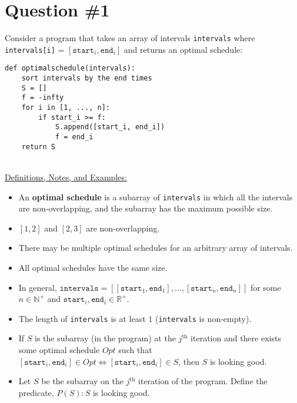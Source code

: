 \documentclass[12pt]{article}
\begin{document}
\renewcommand{\familydefault}{\rmdefault}



\pagebreak
\normalsize

\section*{Question \#1}
Consider a program that takes an array of intervals \texttt{intervals} where \texttt{intervals[i]} = \( [\texttt{start}_i, \texttt{end}_i] \) and returns an optimal schedule: \\
\begin{lstlisting}
def optimalschedule(intervals):
    sort intervals by the end times
    S = []
    f = -infty
    for i in [1, ..., n]:
        if start_i >= f:
            S.append([start_i, end_i])
            f = end_i
    return S
\end{lstlisting}
\leavevmode\\
\underline{Definitions, Notes, and Examples:}
\begin{itemize}
    \item An \textbf{optimal schedule} is a subarray of \texttt{intervals} in which all the intervals are non-overlapping, and the subarray has the maximum possible size.
    \item \( [1, 2] \) and \( [2, 3] \) are non-overlapping.
    \item There may be multiple optimal schedules for an arbitrary array of intervals.
    \item All optimal schedules have the same size.
    \item In general, \( \texttt{intervals} = [[\texttt{start}_1, \texttt{end}_1], \dots, [\texttt{start}_n, \texttt{end}_n]] \) for some \( n \in \mathbb{N}^+ \) and \( \texttt{start}_i, \texttt{end}_i \in \mathbb{R}^+ \).
    \item The length of \texttt{intervals} is at least $1$ (\texttt{intervals} is non-empty).
    \item If \( S \) is the subarray (in the program) at the \( j^{\text{th}} \) iteration and there exists some optimal schedule \( Opt \) such that \( [\texttt{start}_i, \texttt{end}_i] \in Opt \iff [\texttt{start}_i, \texttt{end}_i] \in S \), then \( S \) is looking good.
    \item Let \( S \) be the subarray on the \( j^{\text{th}} \) iteration of the program. Define the predicate, \( P(S): S \) is looking good.
\end{itemize}
\leavevmode\\
\end{document}
